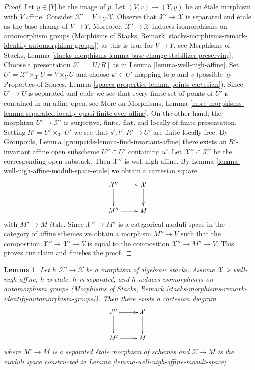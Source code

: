 \documentclass{stacks-project}
\theoremstyle{plain}
\newtheorem{lemma}[subsection]{Lemma}
\theoremstyle{definition}
\theoremstyle{remark}
\numberwithin{equation}{subsection}
\begin{document}
\begin{proof}
\medskip\noindent
Let $y \in |Y|$ be the image of $p$.
Let $(V, v) \to (Y, y)$ be an \'etale morphism with $V$ affine.
Consider $\mathcal{X}' = V \times_Y \mathcal{X}$.
Observe that $\mathcal{X}' \to \mathcal{X}$ is separated and \'etale
as the base change of $V \to Y$. Moreover, $\mathcal{X}' \to \mathcal{X}$
induces isomorphisms on automorphism groups
(Morphisms of Stacks, Remark
\ref{stacks-morphisms-remark-identify-automorphism-groups})
as this is true for
$V \to Y$, see Morphisms of Stacks, Lemma
\ref{stacks-morphisms-lemma-base-change-stabilizer-preserving}.
Choose a presentation $\mathcal{X} = [U/R]$
as in Lemma \ref{lemma-well-nigh-affine}.
Set $U' = \mathcal{X}' \times_\mathcal{X} U = V \times_Y U$
and choose $u' \in U'$ mapping to $p$ and $v$ (possible
by Properties of Spaces, Lemma \ref{spaces-properties-lemma-points-cartesian}).
Since $U' \to U$ is separated and \'etale we see that
every finite set of points of $U'$ is contained in an affine open, see
More on Morphisms, Lemma
\ref{more-morphisms-lemma-separated-locally-quasi-finite-over-affine}.
On the other hand, the morphism $U' \to \mathcal{X}'$ is
surjective, finite, flat, and locally of finite presentation.
Setting $R' = U' \times_{\mathcal{X}'} U'$ we see
that $s', t' : R' \to U'$ are finite locally free.
By Groupoids, Lemma \ref{groupoids-lemma-find-invariant-affine}
there exists an $R'$-invariant affine open subscheme $U'' \subset U'$
containing $u'$.
Let $\mathcal{X}'' \subset \mathcal{X}'$ be
the corresponding open substack. Then $\mathcal{X}''$ is
well-nigh affine. By Lemma \ref{lemma-well-nigh-affine-moduli-space-etale}
we obtain a cartesian square
$$
\xymatrix{
\mathcal{X}'' \ar[r] \ar[d] & \mathcal{X} \ar[d] \\
M'' \ar[r] & M
}
$$
with $M'' \to M$ \'etale. Since $\mathcal{X}'' \to M''$ is
a categorical moduli space in the category of affine schemes
we obtain a morphism $M'' \to V$ such that the composition
$\mathcal{X}'' \to \mathcal{X}' \to V$ is equal to the composition
$\mathcal{X}'' \to M'' \to V$. This proves our claim and finishes
the proof.
\end{proof}

\begin{lemma}
\label{lemma-etale-separated-over-well-nigh-affine}
Let $h : \mathcal{X}' \to \mathcal{X}$ be a morphism of algebraic stacks.
Assume $\mathcal{X}$ is well-nigh affine, $h$ is \'etale, $h$ is separated,
and $h$ induces isomorphisms on automorphism groups
(Morphisms of Stacks, Remark
\ref{stacks-morphisms-remark-identify-automorphism-groups}).
Then there exists a cartesian diagram
$$
\xymatrix{
\mathcal{X}' \ar[d] \ar[r] & \mathcal{X} \ar[d] \\
M' \ar[r] & M
}
$$
where $M' \to M$ is a separated \'etale morphism of schemes and
$\mathcal{X} \to M$ is the moduli space constructed in
Lemma \ref{lemma-well-nigh-affine-moduli-space}.
\end{lemma}
\end{document}
